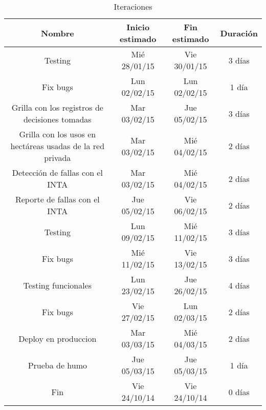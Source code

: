 \begin{landscape}
\begin{table}[ht]
\caption{Iteraciones}
\centering 
\begin{tabular}{c c c c}
\hline
Nombre                                                      & Inicio estimado & Fin estimado & Duración \\
\hline
Testing                                                     & Mié 28/01/15    & Vie 30/01/15 & 3 días   \\
Fix bugs                                                    & Lun 02/02/15    & Lun 02/02/15 & 1 día    \\
Grilla con los registros de decisiones tomadas              & Mar 03/02/15    & Jue 05/02/15 & 3 días   \\
Grilla con los usos en hectáreas usadas de la red privada   & Mar 03/02/15    & Mié 04/02/15 & 2 días   \\
Detección de fallas con el INTA                             & Mar 03/02/15    & Mié 04/02/15 & 2 días   \\
Reporte de fallas con el INTA                               & Jue 05/02/15    & Vie 06/02/15 & 2 días   \\
Testing                                                     & Lun 09/02/15    & Mié 11/02/15 & 3 días   \\
Fix bugs                                                    & Mié 11/02/15    & Vie 13/02/15 & 3 días   \\
Testing funcionales                                         & Lun 23/02/15    & Jue 26/02/15 & 4 días   \\
Fix bugs                                                    & Vie 27/02/15    & Lun 02/03/15 & 2 días   \\
Deploy en produccion                                        & Mar 03/03/15    & Mié 04/03/15 & 2 días   \\
Prueba de humo                                              & Jue 05/03/15    & Jue 05/03/15 & 1 día    \\
Fin                                                         & Vie 24/10/14    & Vie 24/10/14 & 0 días   \\

\end{tabular}
\end{table}
\end{landscape}